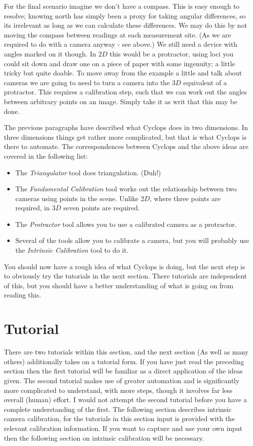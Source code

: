 \documentclass[10pt,a4paper,twoside]{article}
\begin{document}
For the final scenario imagine we don't have a compass.
This is easy enough to resolve; knowing north has simply been a proxy for taking angular differences, so its irrelevant as long as we can calculate these differences. We may do this by not moving the compass between readings at each measurement site. (As we are required to do with a camera anyway - see above.)
We still need a device with angles marked on it though.
In $2D$ this would be a protractor, using loci you could sit down and draw one on a piece of paper with some ingenuity; a little tricky but quite doable.
To move away from the example a little and talk about cameras we are going to need to turn a camera into the $3D$ equivalent of a protractor.
This requires a calibration step, such that we can work out the angles between arbitrary points on an image. Simply take it as writ that this may be done.


The previous paragraphs have described what Cyclops does in two dimensions. In three dimensions things get rather more complicated, but that is what Cyclops is there to automate. 
The correspondences between Cyclops and the above ideas are covered in the following list:
\begin{itemize}
\item The \emph{Triangulator} tool does triangulation. (Duh!)
\item The \emph{Fundamental Calibration} tool works out the relationship between two cameras using points in the scene. Unlike $2D$, where three points are required, in $3D$ seven points are required.
\item The \emph{Protractor} tool allows you to use a calibrated camera as a protractor.
\item Several of the tools allow you to calibrate a camera, but you will probably use the \emph{Intrinsic Calibration} tool to do it.
\end{itemize}
You should now have a rough idea of what Cyclops is doing, but the next step is to obviously try the tutorials in the next section.
There tutorials are independent of this, but you should have a better understanding of what is going on from reading this.



\section{Tutorial}
There are two tutorials within this section, and the next section (As well as many others) additionally takes on a tutorial form. If you have just read the preceding section then the first tutorial will be familiar as a direct application of the ideas given. The second tutorial makes use of greater automation and is significantly more complicated to understand, with more steps, though it involves far less overall (human) effort. I would not attempt the second tutorial before you have a complete understanding of the first. The following section describes intrinsic camera calibration, for the tutorials in this section input is provided with the relevant calibration information. If you want to capture and use your own input then the following section on intrinsic calibration will be necessary.
\end{document}
